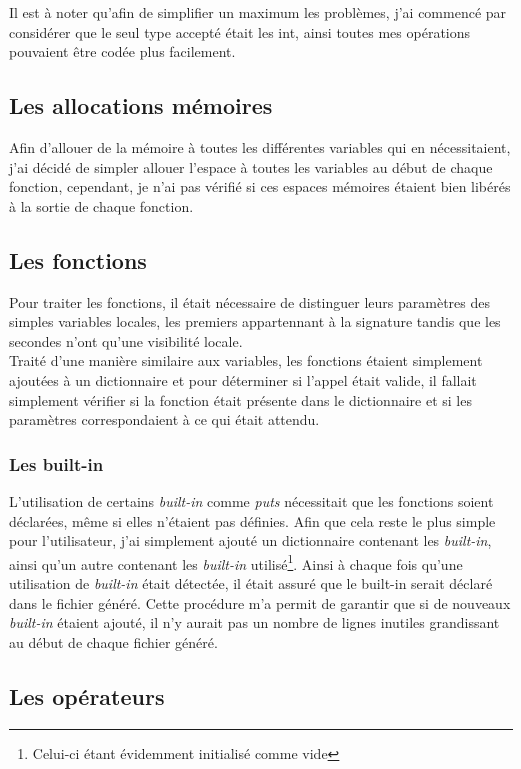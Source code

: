 \documentclass[12pt]{article}
\begin{document}
Il est à noter qu'afin de simplifier un maximum les problèmes, j'ai commencé
par considérer que le seul type accepté était les int, ainsi toutes mes
opérations pouvaient être codée plus facilement.

\subsection{Les allocations mémoires}
Afin d'allouer de la mémoire à toutes les différentes variables qui en
nécessitaient, j'ai décidé de simpler allouer l'espace à toutes les
variables au début de chaque fonction, cependant, je n'ai pas vérifié si
ces espaces mémoires étaient bien libérés à la sortie de chaque fonction.

\subsection{Les fonctions}
Pour traiter les fonctions, il était nécessaire de distinguer leurs
paramètres des simples variables locales, les premiers appartennant à la
signature tandis que les secondes n'ont qu'une visibilité locale.\\

Traité d'une manière similaire aux variables, les fonctions étaient
simplement ajoutées à un dictionnaire et pour déterminer si l'appel était
valide, il fallait simplement vérifier si la fonction était présente dans le
dictionnaire et si les paramètres correspondaient à ce qui était attendu.

\subsubsection{Les built-in}
L'utilisation de certains {\em built-in} comme {\em puts} nécessitait que les
fonctions soient déclarées, même si elles n'étaient pas définies. Afin que
cela reste le plus simple pour l'utilisateur, j'ai simplement ajouté un
dictionnaire contenant les {\em built-in}, ainsi qu'un autre contenant les
{\em built-in} utilisé\footnote{Celui-ci étant évidemment initialisé comme
vide}. Ainsi à chaque fois qu'une utilisation de {\em built-in} était
détectée, il était assuré que le built-in serait déclaré dans le fichier
généré. Cette procédure m'a permit de garantir que si de nouveaux
{\em built-in} étaient ajouté, il n'y aurait pas un nombre de lignes inutiles
grandissant au début de chaque fichier généré.

\subsection{Les opérateurs}
\end{document}
